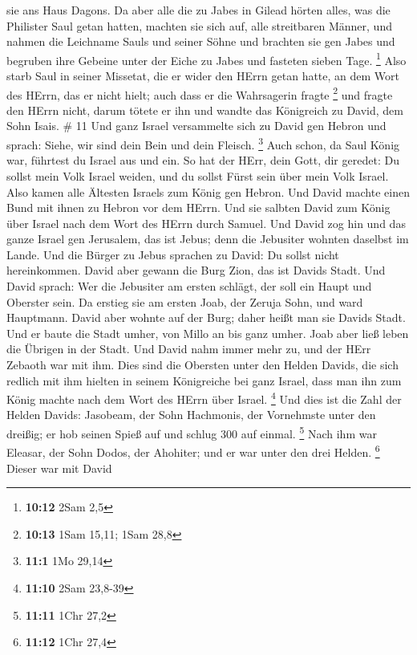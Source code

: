 sie ans Haus Dagons.  Da aber alle die zu Jabes in Gilead
hörten alles, was die Philister Saul getan hatten,  machten
sie sich auf, alle streitbaren Männer, und nahmen die Leichname Sauls
und seiner Söhne und brachten sie gen Jabes und begruben ihre Gebeine
unter der Eiche zu Jabes und fasteten sieben Tage. \footnote{\textbf{10:12}
  2Sam 2,5}  Also starb Saul in seiner Missetat, die er
wider den HErrn getan hatte, an dem Wort des HErrn, das er nicht hielt;
auch dass er die Wahrsagerin fragte \footnote{\textbf{10:13} 1Sam 15,11;
  1Sam 28,8}  und fragte den HErrn nicht, darum tötete er
ihn und wandte das Königreich zu David, dem Sohn Isais. \# 11
 Und ganz Israel versammelte sich zu David gen Hebron und
sprach: Siehe, wir sind dein Bein und dein Fleisch. \footnote{\textbf{11:1}
  1Mo 29,14}  Auch schon, da Saul König war, führtest du
Israel aus und ein. So hat der HErr, dein Gott, dir geredet: Du sollst
mein Volk Israel weiden, und du sollst Fürst sein über mein Volk Israel.
 Also kamen alle Ältesten Israels zum König gen Hebron. Und
David machte einen Bund mit ihnen zu Hebron vor dem HErrn. Und sie
salbten David zum König über Israel nach dem Wort des HErrn durch
Samuel.  Und David zog hin und das ganze Israel gen
Jerusalem, das ist Jebus; denn die Jebusiter wohnten daselbst im Lande.
 Und die Bürger zu Jebus sprachen zu David: Du sollst nicht
hereinkommen. David aber gewann die Burg Zion, das ist Davids Stadt.
 Und David sprach: Wer die Jebusiter am ersten schlägt, der
soll ein Haupt und Oberster sein. Da erstieg sie am ersten Joab, der
Zeruja Sohn, und ward Hauptmann.  David aber wohnte auf der
Burg; daher heißt man sie Davids Stadt.  Und er baute die
Stadt umher, von Millo an bis ganz umher. Joab aber ließ leben die
Übrigen in der Stadt.  Und David nahm immer mehr zu, und der
HErr Zebaoth war mit ihm.  Dies sind die Obersten unter den
Helden Davids, die sich redlich mit ihm hielten in seinem Königreiche
bei ganz Israel, dass man ihn zum König machte nach dem Wort des HErrn
über Israel. \footnote{\textbf{11:10} 2Sam 23,8-39}  Und
dies ist die Zahl der Helden Davids: Jasobeam, der Sohn Hachmonis, der
Vornehmste unter den dreißig; er hob seinen Spieß auf und schlug 300 auf
einmal. \footnote{\textbf{11:11} 1Chr 27,2}  Nach ihm war
Eleasar, der Sohn Dodos, der Ahohiter; und er war unter den drei Helden.
\footnote{\textbf{11:12} 1Chr 27,4}  Dieser war mit David
